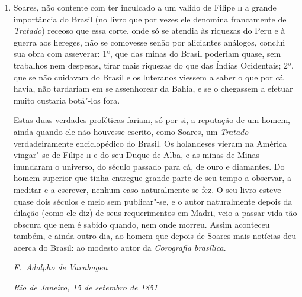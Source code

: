 \begin{enumerate}
\item  Soares, não contente com ter inculcado a um valido de Filipe \textsc{ii} a
grande importância do Brasil (no livro que por vezes ele denomina francamente 
de \textit{Tratado}) receoso que essa corte, onde só se atendia às riquezas
do Peru e à guerra aos hereges, não se comovesse senão por aliciantes análogos, 
conclui sua obra com asseverar: 1º, que das minas do Brasil poderiam
quase, sem trabalhos nem despesas, tirar mais riquezas do que das Índias
Ocidentais; 2º, que se não cuidavam do Brasil e os luteranos viessem a
saber o que por cá havia, não tardariam em se assenhorear da Bahia, e se	\EP[-1]
o chegassem a efetuar muito custaria botá"-los fora.

Estas duas verdades proféticas 
fariam, só por si, a reputação de um homem, ainda 
quando ele não houvesse escrito, como Soares, um \textit{Tratado} verdadeiramente enciclopédico 
do Brasil. Os holandeses vieram na América vingar"-se de Filipe \textsc{ii} e do seu Duque de 
Alba, e as minas de Minas inundaram o universo, do século passado para cá, de ouro e 
diamantes. Do homem superior que tinha entregue grande parte de seu tempo a observar, 
a meditar e a escrever, nenhum caso naturalmente se fez. O seu livro esteve quase dois 
séculos e meio sem publicar"-se, e o autor naturalmente depois da dilação (como ele diz) de 
seus requerimentos em Madri, veio a passar vida tão obscura que nem é sabido quando, nem 
onde morreu. Assim aconteceu também, e ainda outro dia, ao homem que depois de Soares 
mais notícias deu acerca do Brasil: ao modesto autor da \textit{Corografia brasílica}.
\medskip

\indent\textit{F.~Adolpho de Varnhagen}  

\textit{Rio de Janeiro, 15 de setembro de 1851}\\
\end{enumerate}




